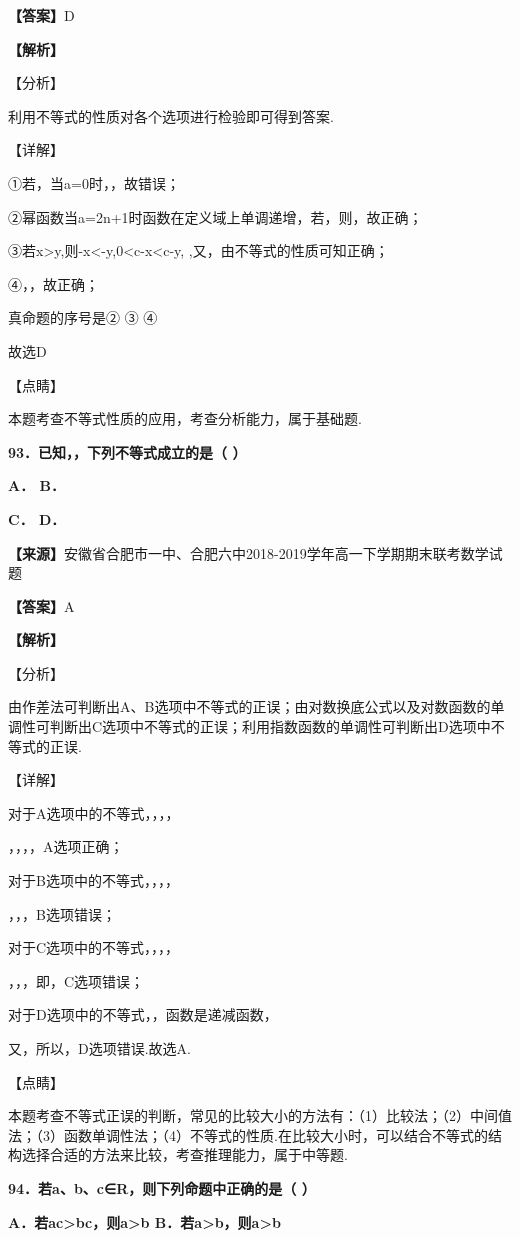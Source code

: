 \documentclass[
]{article}
\begin{document}
\textbf{【答案】}D

\textbf{【解析】}

【分析】

利用不等式的性质对各个选项进行检验即可得到答案.

【详解】

①若，当a=0时，，故错误；

②幂函数当a=2n+1时函数在定义域上单调递增，若，则，故正确；

③若x\textgreater y,则-x\textless-y,0\textless c-x\textless c-y,
,又，由不等式的性质可知正确；

④，，故正确；

真命题的序号是② ③ ④

故选D

【点睛】

本题考查不等式性质的应用，考查分析能力，属于基础题.

\textbf{93．已知，，下列不等式成立的是（ ）}

\textbf{A． B．}

\textbf{C． D．}

\textbf{【来源】}安徽省合肥市一中、合肥六中2018-2019学年高一下学期期末联考数学试题

\textbf{【答案】}A

\textbf{【解析】}

【分析】

由作差法可判断出A、B选项中不等式的正误；由对数换底公式以及对数函数的单调性可判断出C选项中不等式的正误；利用指数函数的单调性可判断出D选项中不等式的正误.

【详解】

对于A选项中的不等式，，，，

，，，，A选项正确；

对于B选项中的不等式，，，，

，，，B选项错误；

对于C选项中的不等式，，，，

，，，即，C选项错误；

对于D选项中的不等式，，函数是递减函数，

又，所以，D选项错误.故选A.

【点睛】

本题考查不等式正误的判断，常见的比较大小的方法有：（1）比较法；（2）中间值法；（3）函数单调性法；（4）不等式的性质.在比较大小时，可以结合不等式的结构选择合适的方法来比较，考查推理能力，属于中等题.

\textbf{94．若a、b、c∈R，则下列命题中正确的是（ ）}

\textbf{A．若ac\textgreater bc，则a\textgreater b
B．若a\textgreater b，则a\textgreater b}
\end{document}
